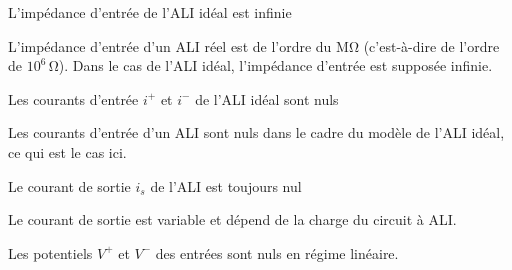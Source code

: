 
\begin{enonce}
  L’impédance d’entrée de l’ALI idéal est infinie
\end{enonce}


\begin{corrige}
  L’impédance d’entrée d’un ALI réel est de l’ordre du \si{\mega\ohm} (c'est-à-dire de l'ordre de $10^6\,\si{\ohm}$). Dans le cas de l’ALI idéal, l'impédance d’entrée est supposée infinie.
\end{corrige}




\begin{enonce}
  Les courants d’entrée \(i^{+}\) et \(i^{-}\) de l’ALI idéal sont nuls
\end{enonce}


\begin{corrige}
  Les courants d’entrée d’un ALI sont nuls dans le cadre du modèle de l’ALI idéal, ce qui est le cas ici.
\end{corrige}




\begin{enonce}
  Le courant de sortie \(i_{s}\) de l’ALI est toujours nul
\end{enonce}


\begin{corrige}
  Le courant de sortie est variable et dépend de la charge du circuit à ALI. 
\end{corrige}




\begin{enonce}
Les potentiels $V^+$ et $V^-$ des entrées sont nuls en régime linéaire.

\end{enonce}


